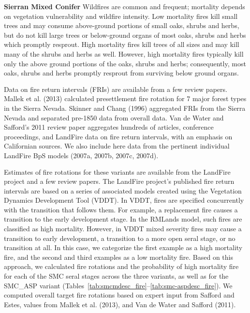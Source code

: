 \textbf{Sierran Mixed Conifer } Wildfires are common and frequent; mortality depends on vegetation vulnerability and wildfire intensity. Low mortality fires kill small trees and may consume above-ground portions of small oaks, shrubs and herbs, but do not kill large trees or below-ground organs of most oaks, shrubs and herbs which promptly resprout. High mortality fires kill trees of all sizes and may kill many of the shrubs and herbs as well. However, high mortality fires typically kill only the above ground portions of the oaks, shrubs and herbs; consequently, most oaks, shrubs and herbs promptly resprout from surviving below ground organs.

Data on fire return intervals (FRIs) are available from a few review papers. Mallek et al. (2013) calculated presettlement fire rotation for 7 major forest types in the Sierra Nevada. Skinner and Chang (1996) aggregated FRIs from the Sierra Nevada and separated pre-1850 data from overall data. Van de Water and Safford’s 2011 review paper aggregates hundreds of articles, conference proceedings, and LandFire data on fire return intervals, with an emphasis on Californian sources. We also include here data from the pertinent individual LandFire BpS models (2007a, 2007b, 2007c, 2007d).

Estimates of fire rotations for these variants are available from the LandFire project and a few review papers. The LandFire project’s published fire return intervals are based on a series of associated models created using the Vegetation Dynamics Development Tool (VDDT). In VDDT, fires are specified concurrently with the transition that follows them. For example, a replacement fire causes a transition to the early development stage. In the RMLands model, such fires are classified as high mortality. However, in VDDT mixed severity fires may cause a transition to early development, a transition to a more open seral stage, or no transition at all. In this case, we categorize the first example as a high mortality fire, and the second and third examples as a low mortality fire. Based on this approach, we calculated fire rotations and the probability of high mortality fire for each of the SMC seral stages across the three variants, as well as for the SMC\_ASP variant (Tables~\ref{tab:smcmdesc_fire}--\ref{tab:smc-aspdesc_fire}). We computed overall target fire rotations based on expert input from Safford and Estes, values from Mallek et al. (2013), and Van de Water and Safford (2011). 


